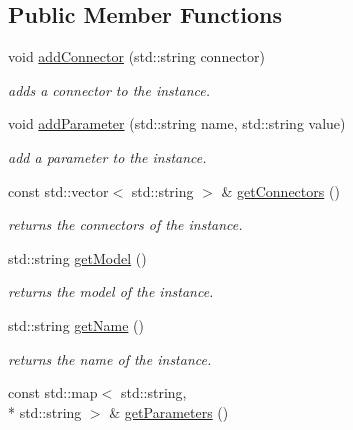 \subsection*{Public Member Functions}
\begin{DoxyCompactItemize}
\item 
void \hyperlink{class_s_p_i_c_e_1_1_instance_af9aeca34e780851a2b024df7c5ff5b54}{add\-Connector} (std\-::string connector)
\begin{DoxyCompactList}\small\item\em adds a connector to the instance. \end{DoxyCompactList}\item 
void \hyperlink{class_s_p_i_c_e_1_1_instance_a8d69bbbea5ece0949e100c464e412f20}{add\-Parameter} (std\-::string name, std\-::string value)
\begin{DoxyCompactList}\small\item\em add a parameter to the instance. \end{DoxyCompactList}\item 
\hypertarget{class_s_p_i_c_e_1_1_instance_acce8940edeaa3d79c522006f987e0711}{const std\-::vector$<$ std\-::string $>$ \& \hyperlink{class_s_p_i_c_e_1_1_instance_acce8940edeaa3d79c522006f987e0711}{get\-Connectors} ()}\label{class_s_p_i_c_e_1_1_instance_acce8940edeaa3d79c522006f987e0711}

\begin{DoxyCompactList}\small\item\em returns the connectors of the instance. \end{DoxyCompactList}\item 
\hypertarget{class_s_p_i_c_e_1_1_instance_afc74cbe93df9c473a53db83a325f8f9d}{std\-::string \hyperlink{class_s_p_i_c_e_1_1_instance_afc74cbe93df9c473a53db83a325f8f9d}{get\-Model} ()}\label{class_s_p_i_c_e_1_1_instance_afc74cbe93df9c473a53db83a325f8f9d}

\begin{DoxyCompactList}\small\item\em returns the model of the instance. \end{DoxyCompactList}\item 
\hypertarget{class_s_p_i_c_e_1_1_instance_ac0fc966d4386ddb71d99361e3fccb311}{std\-::string \hyperlink{class_s_p_i_c_e_1_1_instance_ac0fc966d4386ddb71d99361e3fccb311}{get\-Name} ()}\label{class_s_p_i_c_e_1_1_instance_ac0fc966d4386ddb71d99361e3fccb311}

\begin{DoxyCompactList}\small\item\em returns the name of the instance. \end{DoxyCompactList}\item 
\hypertarget{class_s_p_i_c_e_1_1_instance_aee7d59083b78d31ac5c19ab508da91e0}{const std\-::map$<$ std\-::string, \\*
std\-::string $>$ \& \hyperlink{class_s_p_i_c_e_1_1_instance_aee7d59083b78d31ac5c19ab508da91e0}{get\-Parameters} ()}\label{class_s_p_i_c_e_1_1_instance_aee7d59083b78d31ac5c19ab508da91e0}


\end{DoxyCompactItemize}
